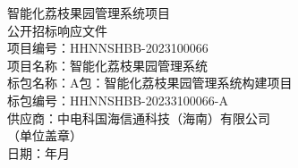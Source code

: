 \documentclass[UTF8,a4paper,zihao=-4]{ctexart}
\newcommand{\BidTitle}{智能化荔枝果园管理系统项目}
\newcommand{\BidDocType}{公开招标响应文件}
\newcommand{\ProjectNo}{HHNNSHBB-2023100066}
\newcommand{\ProjectName}{智能化荔枝果园管理系统}
\newcommand{\PackageName}{A包：智能化荔枝果园管理系统构建项目}
\newcommand{\PackageNo}{HHNNSHBB-20233100066-A}
\newcommand{\SupplierName}{中电科国海信通科技（海南）有限公司}
\newcommand{\BidDate}{\the\year 年\the\month 月}
\begin{document}
\thispagestyle{empty}
\begin{center}
  {\heiti \BidTitle\\[8pt] \BidDocType}\\[36pt]
  {\songti 项目编号：\ProjectNo}\\[8pt]
  {\songti 项目名称：\ProjectName}\\[8pt]
  {\songti 标包名称：\PackageName}\\[8pt]
  {\songti 标包编号：\PackageNo}\\[24pt]
  {\heiti 供应商：\SupplierName}\\[8pt]
  {\songti （单位盖章）}\\[28pt]
  {\songti 日期：\BidDate}
\end{center}
\clearpage

\thispagestyle{empty}
\tableofcontents
\clearpage

\setcounter{page}{1}

\end{document}
